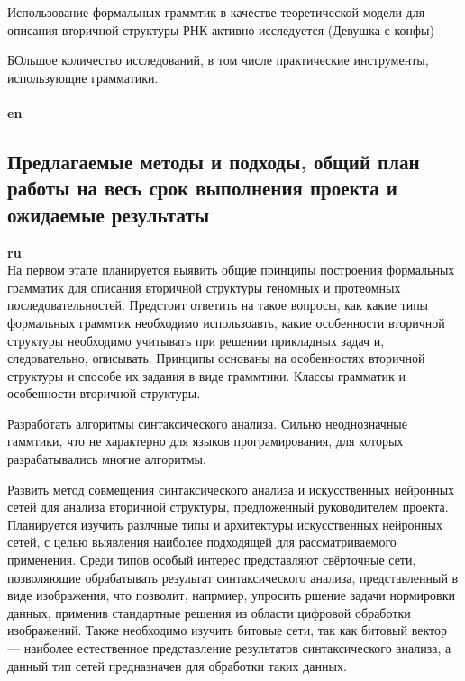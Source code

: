 \documentclass[12pt]{article}  %
\theoremstyle{remark}
\begin{document}
Использование формальных граммтик в качестве теоретической модели для описания вторичной структуры РНК активно исследуется (Девушка с конфы)

БОльшое количество исследований, в том числе практические инструменты, использующие грамматики.
\\
\\
\textbf{en}\\



\subsection{Предлагаемые методы и подходы, общий план работы на весь срок выполнения проекта и ожидаемые результаты }

\textbf{ru}\\
На первом этапе планируется выявить общие принципы построения формальных грамматик для описания вторичной структуры геномных и протеомных последовательностей. Предстоит ответить на такое вопросы, как какие типы формальных граммтик необходимо использоавть, какие особенности вторичной структуры необходимо учитывать при решении прикладных задач и, следовательно, описывать.
Принципы основаны на особенностях вторичной структуры и способе их задания в виде граммтики.
Классы грамматик и особенности вторичной структуры.

Разработать алгоритмы синтаксического анализа.
Сильно неоднозначные гаммтики, что не характерно для языков програмирования, для которых разрабатывались многие алгоритмы.

Развить метод совмещения синтаксического анализа и искусственных нейронных сетей для анализа вторичной структуры, предложенный руководителем проекта.
Планируется изучить разлчные типы и архитектуры искусственных нейронных сетей, с целью выявления наиболее подходящей для рассматриваемого применения.
Среди типов особый интерес представляют свёрточные сети, позволяющие обрабатывать результат синтаксического анализа, представленный в виде изображения, что позволит, напрмиер, упросить ршение задачи нормировки данных, применив стандартные решения из области цифровой обработки изображений.
Также необходимо изучить битовые сети, так как битовый вектор --- наиболее естественное представление результатов синтаксического анализа, а данный тип сетей предназначен для обработки таких данных.
\end{document}
